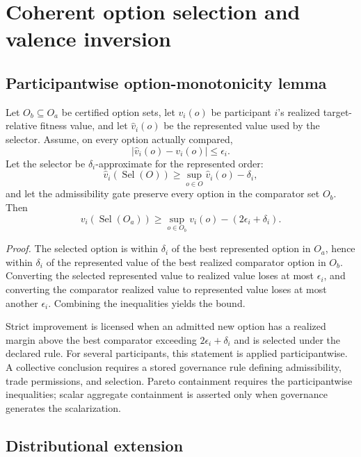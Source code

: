 \documentclass[11pt]{article}
\begin{document}
\section{Coherent option selection and valence inversion}

\subsection{Participantwise option-monotonicity lemma}

Let $O_b\subseteq O_a$ be certified option sets, let $v_i(o)$ be participant $i$'s realized target-relative fitness value, and let $\widehat v_i(o)$ be the represented value used by the selector. Assume, on every option actually compared,
\begin{equation}
|\widehat v_i(o)-v_i(o)|\le\epsilon_i.
\end{equation}
Let the selector be $\delta_i$-approximate for the represented order:
\begin{equation}
\widehat v_i(\operatorname{Sel}(O))\ge \sup_{o\in O}\widehat v_i(o)-\delta_i,
\end{equation}
and let the admissibility gate preserve every option in the comparator set $O_b$. Then
\begin{equation}
\boxed{v_i(\operatorname{Sel}(O_a))\ge \sup_{o\in O_b}v_i(o)-(2\epsilon_i+\delta_i).}
\end{equation}

\textit{Proof.} The selected option is within $\delta_i$ of the best represented option in $O_a$, hence within $\delta_i$ of the represented value of the best realized comparator option in $O_b$. Converting the selected represented value to realized value loses at most $\epsilon_i$, and converting the comparator realized value to represented value loses at most another $\epsilon_i$. Combining the inequalities yields the bound.

Strict improvement is licensed when an admitted new option has a realized margin above the best comparator exceeding $2\epsilon_i+\delta_i$ and is selected under the declared rule. For several participants, this statement is applied participantwise. A collective conclusion requires a stored governance rule defining admissibility, trade permissions, and selection. Pareto containment requires the participantwise inequalities; scalar aggregate containment is asserted only when governance generates the scalarization.

\subsection{Distributional extension}
\end{document}
